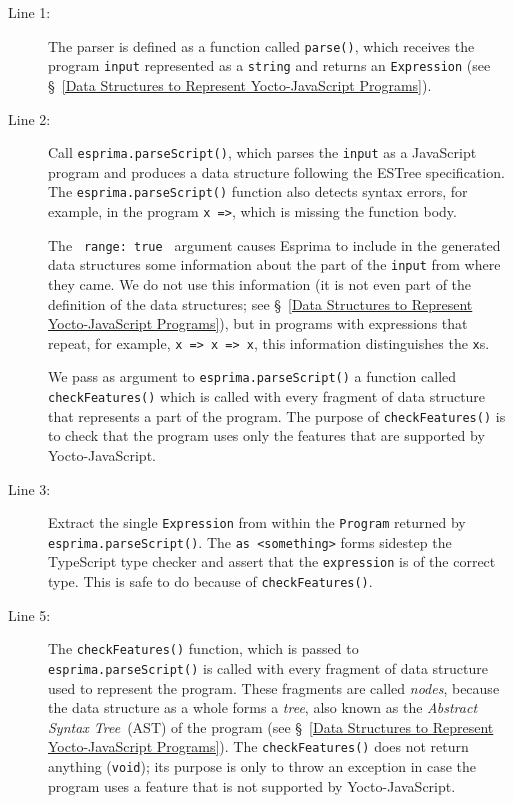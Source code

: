\documentclass[12pt, oneside]{book}
\begin{document}
\begin{description}
\item [Line 1:]

The parser is defined as a function called \texttt{parse()}, which receives the program \texttt{input} represented as a \texttt{string} and returns an \texttt{Expression} (see §~\ref{Data Structures to Represent Yocto-JavaScript Programs}).

\item [Line 2:]

Call \texttt{esprima.parseScript()}, which parses the \texttt{input} as a JavaScript program and produces a data structure following the ESTree specification. The \texttt{esprima.parseScript()} function also detects syntax errors, for example, in the program \texttt{x =>}, which is missing the function body.

The \texttt{{ range: true }} argument causes Esprima to include in the generated data structures some information about the part of the \texttt{input} from where they came. We do not use this information (it is not even part of the definition of the data structures; see §~\ref{Data Structures to Represent Yocto-JavaScript Programs}), but in programs with expressions that repeat, for example, \texttt{x => x => x}, this information distinguishes the \texttt{x}s.

We pass as argument to \texttt{esprima.parseScript()} a function called \texttt{checkFeatures()} which is called with every fragment of data structure that represents a part of the program. The purpose of \texttt{checkFeatures()} is to check that the program uses only the features that are supported by Yocto-JavaScript.

\item [Line 3:]

Extract the single \texttt{Expression} from within the \texttt{Program} returned by \texttt{esprima.parseScript()}. The \texttt{as <something>} forms sidestep the TypeScript type checker and assert that the \texttt{expression} is of the correct type. This is safe to do because of \texttt{checkFeatures()}.

\item [Line 5:]

The \texttt{checkFeatures()} function, which is passed to \texttt{esprima.parseScript()} is called with every fragment of data structure used to represent the program. These fragments are called \emph{nodes}, because the data structure as a whole forms a \emph{tree}, also known as the \emph{Abstract Syntax Tree}~(AST) of the program (see §~\ref{Data Structures to Represent Yocto-JavaScript Programs}). The \texttt{checkFeatures()} does not return anything (\texttt{void}); its purpose is only to throw an exception in case the program uses a feature that is not supported by Yocto-JavaScript.


\end{description}
\end{document}

